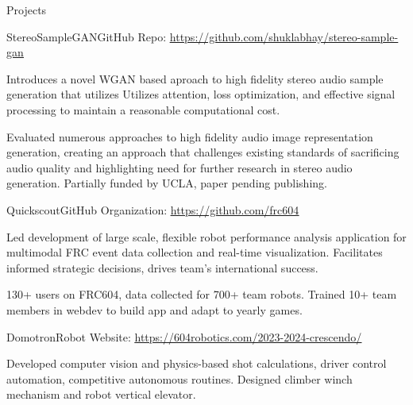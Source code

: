\documentclass[
  10pt, %
]{resume} %
\begin{document}

\begin{rSection}{Projects}

  
  \begin{rSubsection}{StereoSampleGAN}{}{GitHub Repo: \underline{\href{https://github.com/shuklabhay/stereo-sample-gan}{https://github.com/shuklabhay/stereo-sample-gan}}}{}
       
    \item Introduces a novel WGAN based aproach to high fidelity stereo audio sample generation that utilizes Utilizes attention, loss optimization, and effective signal processing to maintain a reasonable computational cost.
        
    \item Evaluated numerous approaches to high fidelity audio image representation generation, creating an approach that challenges existing standards of sacrificing audio quality and highlighting need for further research in stereo audio generation. Partially funded by UCLA, paper pending publishing.
        
  \end{rSubsection}
      
  \begin{rSubsection}{Quickscout}{}{GitHub Organization: \underline{\href{https://github.com/frc604}{https://github.com/frc604}}}{}
       
    \item Led development of large scale, flexible robot performance analysis application for multimodal FRC event data collection and real-time visualization. Facilitates informed strategic decisions, drives team's international success.
        
    \item 130+ users on FRC604, data collected for 700+ team robots. Trained 10+ team members in webdev to build app and adapt to yearly games.
        
  \end{rSubsection}
      
  \begin{rSubsection}{Domotron}{}{Robot Website: \underline{\href{https://604robotics.com/2023-2024-crescendo/}{https://604robotics.com/2023-2024-crescendo/}}}{}
       
    \item Developed computer vision and physics-based shot calculations, driver control automation, competitive autonomous routines. Designed climber winch mechanism and robot vertical elevator.
        

\end{rSubsection}
\end{rSection}
\end{document}
